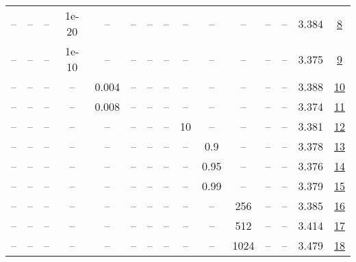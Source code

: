 \begin{table}[H]
\begin{tabular}{ccccccccccccccc}
-- & -- & -- & 1e-20 & -- & -- & -- & -- & -- & -- & -- & -- & -- & 3.384 & \href{https://wandb.ai/stanford-mercury/optimizer-scaling/runs/sweep-130m-5B-soap276679lr0.016-wd0.1-minlr0-warmup500-b10.95-b2-5f10f6}{8} \\
-- & -- & -- & 1e-10 & -- & -- & -- & -- & -- & -- & -- & -- & -- & 3.375 & \href{https://wandb.ai/stanford-mercury/optimizer-scaling/runs/sweep-130m-5B-soap4b27f2lr0.016-wd0.1-minlr0-warmup500-b10.95-b2-5294df}{9} \\
-- & -- & -- & -- & 0.004 & -- & -- & -- & -- & -- & -- & -- & -- & 3.388 & \href{https://wandb.ai/stanford-mercury/optimizer-scaling/runs/sweep-130m-5B-soap81604flr0.004-wd0.1-minlr0-warmup500-b10.95-b2-4b079f}{10} \\
-- & -- & -- & -- & 0.008 & -- & -- & -- & -- & -- & -- & -- & -- & 3.374 & \href{https://wandb.ai/stanford-mercury/optimizer-scaling/runs/sweep-130m-5B-soapd838balr0.008-wd0.1-minlr0-warmup500-b10.95-b2-d84977}{11} \\
-- & -- & -- & -- & -- & -- & -- & -- & 10 & -- & -- & -- & -- & 3.381 & \href{https://wandb.ai/stanford-mercury/optimizer-scaling/runs/sweep-130m-5B-soap88bb76lr0.016-wd0.1-minlr0-warmup500-b10.95-b2-921e14}{12} \\
-- & -- & -- & -- & -- & -- & -- & -- & -- & 0.9 & -- & -- & -- & 3.378 & \href{https://wandb.ai/stanford-mercury/optimizer-scaling/runs/sweep-130m-5B-soap857baalr0.016-wd0.1-minlr0-warmup500-b10.95-b2-df74ef}{13} \\
-- & -- & -- & -- & -- & -- & -- & -- & -- & 0.95 & -- & -- & -- & 3.376 & \href{https://wandb.ai/stanford-mercury/optimizer-scaling/runs/sweep-130m-5B-soap52233clr0.016-wd0.1-minlr0-warmup500-b10.95-b2-7967c6}{14} \\
-- & -- & -- & -- & -- & -- & -- & -- & -- & 0.99 & -- & -- & -- & 3.379 & \href{https://wandb.ai/stanford-mercury/optimizer-scaling/runs/sweep-130m-5B-soap23935blr0.016-wd0.1-minlr0-warmup500-b10.95-b2-69ab75}{15} \\
-- & -- & -- & -- & -- & -- & -- & -- & -- & -- & 256 & -- & -- & 3.385 & \href{https://wandb.ai/stanford-mercury/optimizer-scaling/runs/sweep-130m-5B-soapfbdf35lr0.016-wd0.1-minlr0-warmup500-b10.95-b2-aa7795}{16} \\
-- & -- & -- & -- & -- & -- & -- & -- & -- & -- & 512 & -- & -- & 3.414 & \href{https://wandb.ai/stanford-mercury/optimizer-scaling/runs/sweep-130m-5B-soap08aaa9lr0.016-wd0.1-minlr0-warmup500-b10.95-b2-5fc6c2}{17} \\
-- & -- & -- & -- & -- & -- & -- & -- & -- & -- & 1024 & -- & -- & 3.479 & \href{https://wandb.ai/stanford-mercury/optimizer-scaling/runs/sweep-130m-5B-soap25e509lr0.016-wd0.1-minlr0-warmup500-b10.95-b2-3ce281}{18} \\

\end{tabular}
\end{table}
